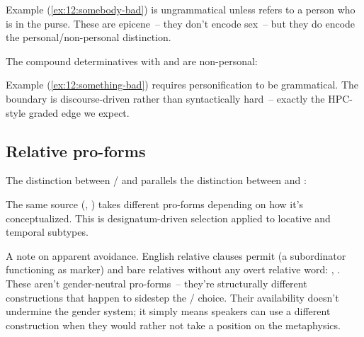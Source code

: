 \z
{}
\z
Example (\ref{ex:12:somebody-bad}) is ungrammatical unless  refers to a person who is in the purse. These are epicene~-- they don't encode sex~-- but they do encode the personal/non-personal distinction.

The compound determinatives with  and  are non-personal:

\z
{}
\z
Example (\ref{ex:12:something-bad}) requires personification to be grammatical. The boundary is discourse-driven rather than syntactically hard~-- exactly the HPC-style graded edge we expect.

\subsection{Relative pro-forms}
\label{sec:12:relative-proforms}

The distinction between / and  parallels the distinction between  and :

\z
{}
\z

\z
{}
\z
The same source (, ) takes different pro-forms depending on how it's conceptualized. This is designatum-driven selection applied to locative and temporal subtypes.

A note on apparent avoidance. English relative clauses permit  (a subordinator functioning as marker) and bare relatives without any overt relative word: , . These aren't gender-neutral pro-forms~-- they're structurally different constructions that happen to sidestep the / choice. Their availability doesn't undermine the gender system; it simply means speakers can use a different construction when they would rather not take a position on the metaphysics.



